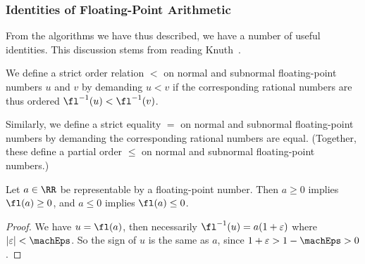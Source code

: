 \subsubsection{Identities of Floating-Point Arithmetic}

From the algorithms we have thus described, we have a number of useful
identities. This discussion stems from reading Knuth~\cite{taocp2}.

\begin{defn}
  We define a strict order relation $<$ on normal and subnormal
  floating-point numbers $u$ and $v$ by demanding $u < v$ if the
  corresponding rational numbers are thus ordered 
  $\fl^{-1}(u)<\fl^{-1}(v)$.

  Similarly, we define a strict equality $=$ on normal and subnormal
  floating-point numbers by demanding the corresponding rational numbers
  are equal. (Together, these define a partial order $\leq$ on normal
  and subnormal floating-point numbers.)
\end{defn}

\begin{lemma}\label{lemma:fl-preserves-sign}
  Let $a\in\RR$ be representable by a floating-point number. Then $a\geq 0$ 
  implies $\fl(a)\geq 0$, and $a\leq 0$ implies $\fl(a)\leq 0$.
\end{lemma}
\begin{proof}
  We have $u=\fl(a)$, then necessarily $\fl^{-1}(u) = a(1 + \varepsilon)$
  where $|\varepsilon| < \machEps$. So the sign of $u$ is the same as
  $a$, since $1 + \varepsilon > 1 - \machEps > 0$.
\end{proof}

